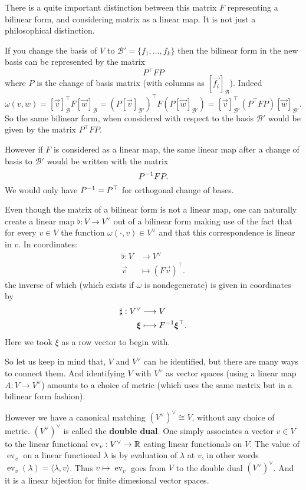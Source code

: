 \documentclass[12pt]{amsart}
\begin{document}
\begin{remark}
There is a quite important distinction between this matrix $F$ representing a bilinear form, and considering matrix as a linear map. It is not just a philosophical distinction.

If you change the basis of $V$ to $\mathcal{B}' = \{f_1, \ldots, f_k\}$ then the bilinear form in the new basis can be represented by the matrix $$P^\top F P$$ where $P$ is the change of basis matrix (with columns as $[\vec{f_i}]_\mathcal{B}$). Indeed $\omega(v,w) = [\vec{v}]_{\mathcal{B}}^\top F [\vec{w}]_{\mathcal{B} } = (P[\vec{v}]_{\mathcal{B}'})^\top F (P[\vec{w}]_{\mathcal{B}'}) = [\vec{v}]_{\mathcal{B}'}^\top (P^\top F P) [\vec{w}]_{\mathcal{B}' } $. So the same bilinear form, when considered with respect to the basis $\mathcal{B}'$ would be given by the matrix $P^\top FP$.

 However if $F$ is considered as a linear map, the same linear map after a change of basis to $\mathcal{B}'$ would be written with the matrix $$P^{-1} F P.$$ We would only have $P^{-1} = P^\top$ for orthogonal change of bases. 
\end{remark}

Even though the matrix of a bilinear form is not a linear map, one can naturally create a linear map $\flat : V \to V^\vee$ out of a bilinear form making use of the fact that for every $v \in V$ the function $\omega(\cdot, v) \in V^\vee$ and that this correspondence is linear in $v$. In coordinates:
\begin{align*}
	\flat : V & \longrightarrow V^\vee\\
	 \vec{v}& \longmapsto (F\vec{v})^\top.
\end{align*}
the inverse of which (which exists if $\omega$ is nondegenerate) is given in coordinates by
\begin{align*}
	\sharp : V^\vee &\longrightarrow V\\
	\mathbf{\boldsymbol{\xi}} &\longmapsto F^{-1} \mathbf{\boldsymbol{\xi}}^\top. 
\end{align*}
Here we took $\xi$ as a row vector to begin with.

So let us keep in mind that, $V$ and $V^\vee$ can be identified, but there are many ways to connect them. And identifying $V$ with $V^\vee$ as vector spaces (using a linear map $A :  V \to V^\vee$) amounts to a choice of metric (which uses the same matrix but in a bilinear form fashion). 

However we have a canonical matching $(V^\vee)^\vee \cong V$, without any choice of metric. $(V^\vee)^\vee$ is called the {\bf double dual}. One simply associates a vector $v \in V$ to the linear functional $\operatorname{ev}_v: V^\vee \to \mathbb{R}$ eating linear functionals on $V$. The value of $\operatorname{ev}_v$ on a linear functional $\lambda$ is by evaluation of $\lambda$ at $v$, in other words $\operatorname{ev}_v(\lambda) = \langle \lambda, v\rangle$. Thus $v \mapsto \operatorname{ev}_v$ goes from $V$ to the double dual $(V^\vee)^\vee$. And it is a linear bijection for finite dimesional vector spaces. 
\end{document}
